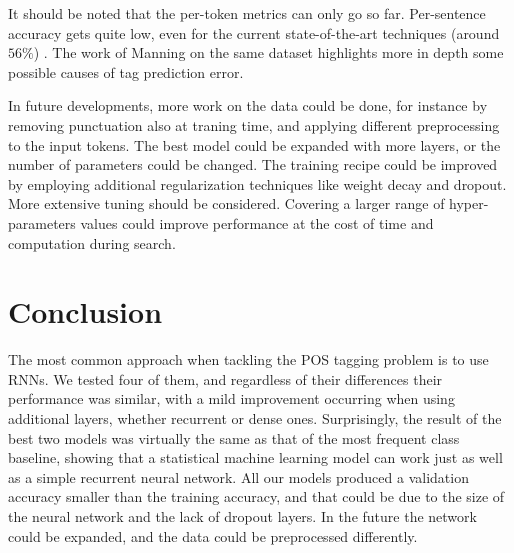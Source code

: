 \documentclass[11pt]{article}
\begin{document}
It should be noted that the per-token metrics can only go so far. Per-sentence accuracy gets quite low, even for the current state-of-the-art techniques (around $56\%$) \cite{postaggers-sot}. The work of Manning on the same dataset highlights more in depth some possible causes of tag prediction error.

In future developments, more work on the data could be done, for instance by removing punctuation also at traning time, and applying different preprocessing to the input tokens.
The best model could be expanded with more layers, or the number of parameters could be changed. The training recipe could be improved by employing additional regularization techniques like weight decay and dropout. More extensive tuning should be considered. Covering a larger range of hyper-parameters values could improve performance at the cost of time and computation during search.

\section{Conclusion}
\label{sec:conclusion}


The most common approach when tackling the POS tagging problem is to use RNNs. We tested four of them, and regardless of their differences their performance was similar, with a mild improvement occurring when using additional layers, whether recurrent or dense ones. Surprisingly, the result of the best two models was virtually the same as that of the most frequent class baseline, showing that a statistical machine learning model can work just as well as a simple recurrent neural network. All our models produced a validation accuracy smaller than the training accuracy, and that could be due to the size of the neural network and the lack of dropout layers. In the future the network could be expanded, and the data could be preprocessed differently.


\label{sec:links}


%


\end{document}
